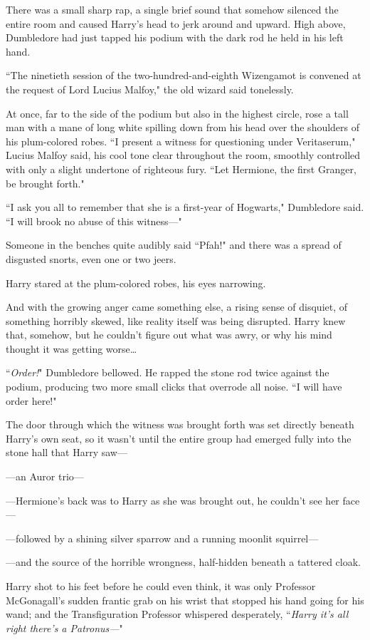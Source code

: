 There was a small sharp rap, a single brief sound that somehow silenced the entire room and caused Harry's head to jerk around and upward. High above, Dumbledore had just tapped his podium with the dark rod he held in his left hand.

``The ninetieth session of the two-hundred-and-eighth Wizengamot is convened at the request of Lord Lucius Malfoy," the old wizard said tonelessly.

At once, far to the side of the podium but also in the highest circle, rose a tall man with a mane of long white spilling down from his head over the shoulders of his plum-colored robes. ``I present a witness for questioning under Veritaserum," Lucius Malfoy said, his cool tone clear throughout the room, smoothly controlled with only a slight undertone of righteous fury. ``Let Hermione, the first Granger, be brought forth."

``I ask you all to remember that she is a first-year of Hogwarts," Dumbledore said. ``I will brook no abuse of this witness—"

Someone in the benches quite audibly said ``Pfah!" and there was a spread of disgusted snorts, even one or two jeers.

Harry stared at the plum-colored robes, his eyes narrowing.

And with the growing anger came something else, a rising sense of disquiet, of something horribly skewed, like reality itself was being disrupted. Harry knew that, somehow, but he couldn't figure out what was awry, or why his mind thought it was getting worse{\ldots}

``\emph{Order!}" Dumbledore bellowed. He rapped the stone rod twice against the podium, producing two more small clicks that overrode all noise. ``I will have order here!"

The door through which the witness was brought forth was set directly beneath Harry's own seat, so it wasn't until the entire group had emerged fully into the stone hall that Harry saw—

—an Auror trio—

—Hermione's back was to Harry as she was brought out, he couldn't see her face—

—followed by a shining silver sparrow and a running moonlit squirrel—

—and the source of the horrible wrongness, half-hidden beneath a tattered cloak.

Harry shot to his feet before he could even think, it was only Professor McGonagall's sudden frantic grab on his wrist that stopped his hand going for his wand; and the Transfiguration Professor whispered desperately, ``\emph{Harry it's all right there's a Patronus—}"

